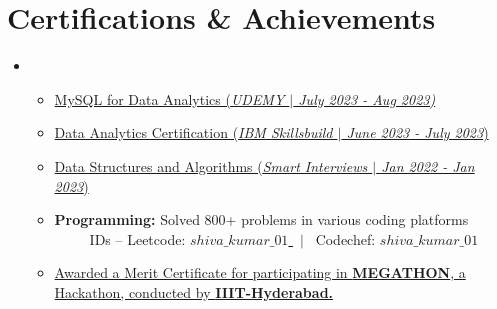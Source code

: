 \documentclass[letterpaper,11pt]{article}
\newcommand{\resumeItem}[1]{
  \item\small{
    {#1 \vspace{-2pt}}
  }
}
\newcommand{\resumeItemListStart}{\begin{itemize}}
\newcommand{\resumeItemListEnd}{\end{itemize}\vspace{-6pt}}
\begin{document}
\section{Certifications \& Achievements}
 \begin{itemize}[leftmargin=0.15in, label={}]
    
    \item{
    \resumeItemListStart
        \resumeItem{
            \href{https://}{ 
            {MySQL for Data Analytics (\emph{UDEMY $|$ July 2023 - Aug 2023)}
            }\faExternalLink*} \\             
        } \vspace{3pt}
        \resumeItem{
        \href{https://}{ 
            {Data Analytics Certification (\emph{IBM Skillsbuild $|$ June 2023 - July 2023}) 
            }\faExternalLink*}
        } \vspace{3pt}
        \resumeItem{
        \href{https://}{ {Data Structures and Algorithms (\emph{Smart Interviews $|$ Jan 2022 - Jan 2023})  
            }\faExternalLink*}
        }
        \resumeItem{
            \textbf{ Programming: }{Solved 800+ problems in various coding platforms} \vspace{3pt}
            { \\ \ \ \ \ \ IDs --
            {Leetcode: \href{https://leetcode.com/shiva_kumar_01}{{\bf$shiva\_kumar\_01$ }\faExternalLink*} } \ $|$ \ 
            {Codechef: \href{https://www.codechef.com/users/shiva_kumar_01}{{\bf$shiva\_kumar\_01$ }\faExternalLink*} }
            }
        }
        \resumeItem{
\href{https://drive.google.com/file/d/1e3po31SH4F8SK9jfTujhWRTyP6mIwR3i/view?usp=sharing}{Awarded a Merit Certificate for participating in {\bf MEGATHON}, a Hackathon, conducted by  {\ttfamily\bfseries IIIT-Hyderabad.}
 \faExternalLink*
 } 
        }
     \resumeItemListEnd
  }
 \end{itemize}
\end{document}

